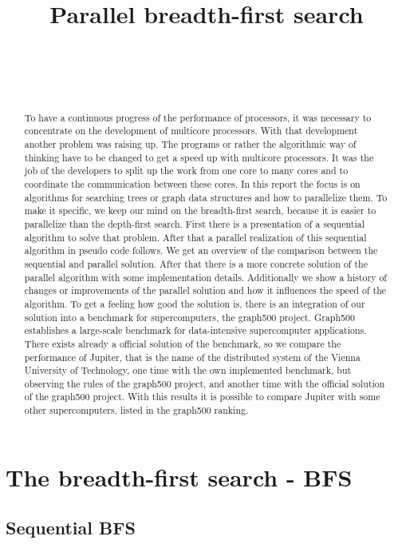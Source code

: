 \documentclass[12pt,a4paper]{article}
\title{Parallel breadth-first search}
\author{
 \authorname{Alexander Gallauner} \\
 \studentnumber{1026090} \\
 \curriculum{534} \\
 \email{alexander.gallauner@gmail.com}
}
\begin{document}
\maketitle
\begin{abstract}
To have a continuous progress of the performance of processors, it was necessary to concentrate on the development of multicore processors. With that development another problem was raising up. The programs or rather the algorithmic way of thinking have to be changed to get a speed up with multicore processors. It was the job of the developers to split up the work from one core to many cores and to coordinate the communication between these cores. In this report the focus is on algorithms for searching trees or graph data structures and how to parallelize them. To make it specific, we keep our mind on the breadth-first search, because it is easier to parallelize than the depth-first search. First there is a presentation of a sequential algorithm to solve that problem. After that a parallel realization of this sequential algorithm in pseudo code follows. We get an overview of the comparison between the sequential and parallel solution. After that there is a more concrete solution of the parallel algorithm with some implementation details. Additionally we show a history of changes or improvements of the parallel solution and how it influences the speed of the algorithm.
To get a feeling how good the solution is, there is an integration of our solution into a benchmark for supercomputers, the graph500 project. Graph500 establishes a large-scale benchmark for data-intensive supercomputer applications. There exists already a official solution of the benchmark, so we compare the performance of Jupiter, that is the name of the distributed system of the Vienna University of Technology, one time with the own implemented benchmark, but observing the rules of the graph500 project, and another time with the official solution of the graph500 project. With this results it is possible to compare Jupiter with some other supercomputers, listed in the graph500 ranking.
\end{abstract}

\clearpage

\section{The breadth-first search - BFS}
\label{sec:breadth-first search}

\subsection{Sequential BFS}
\label{sec:sequential-bfs}
\end{document}
